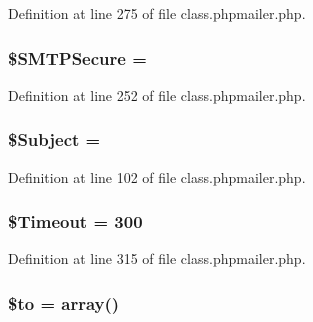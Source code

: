 Definition at line 275 of file class.\+phpmailer.\+php.

\subsubsection[{\texorpdfstring{\$\+S\+M\+T\+P\+Secure}{$SMTPSecure}}]{\setlength{\rightskip}{0pt plus 5cm}\$S\+M\+T\+P\+Secure = \textquotesingle{}\textquotesingle{}}\hypertarget{class_p_h_p_mailer_a70335250830975e0f1f77bb73b90ca54}{}\label{class_p_h_p_mailer_a70335250830975e0f1f77bb73b90ca54}


Definition at line 252 of file class.\+phpmailer.\+php.

\subsubsection[{\texorpdfstring{\$\+Subject}{$Subject}}]{\setlength{\rightskip}{0pt plus 5cm}\$Subject = \textquotesingle{}\textquotesingle{}}\hypertarget{class_p_h_p_mailer_a2b58ba25576b17f0a874336a68a44a62}{}\label{class_p_h_p_mailer_a2b58ba25576b17f0a874336a68a44a62}


Definition at line 102 of file class.\+phpmailer.\+php.

\subsubsection[{\texorpdfstring{\$\+Timeout}{$Timeout}}]{\setlength{\rightskip}{0pt plus 5cm}\$Timeout = 300}\hypertarget{class_p_h_p_mailer_acaf3ec06f89f4024c5dbeb1a9ecf321c}{}\label{class_p_h_p_mailer_acaf3ec06f89f4024c5dbeb1a9ecf321c}


Definition at line 315 of file class.\+phpmailer.\+php.

\subsubsection[{\texorpdfstring{\$to}{$to}}]{\setlength{\rightskip}{0pt plus 5cm}\$to = array()\hspace{0.3cm}{\ttfamily [protected]}}\hypertarget{class_p_h_p_mailer_ac19f839b525d6d99d063fe56bf2a6d3b}{}\label{class_p_h_p_mailer_ac19f839b525d6d99d063fe56bf2a6d3b}


